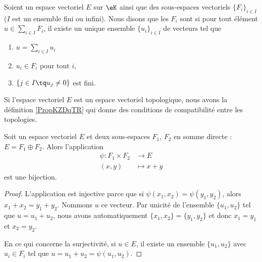 \begin{definition}       \label{DEFooIJDNooRUDUYF}
	Soient un espace vectoriel \( E\) sur \(\eK\) ainsi que des sous-espaces vectoriels \( \{ F_i \}_{i\in I}\) (\( I\) est un ensemble fini ou infini). Nous disons que les \( F_i\) sont  si pour tout élément \( u\in\sum_{i\in I}F_i\), il existe un unique ensemble \( \{ u_i \}_{i\in I}\) de vecteurs tel que
	\begin{enumerate}
		\item
		      \( u=\sum_{i\in I}u_i\)
		\item
		      \( u_i\in F_i\) pour tout \( i\),
		\item
		      \( \{ j\in I\tq u_j\neq 0 \}\) est fini.
	\end{enumerate}

	Si l'espace vectoriel \( E\) est un espace vectoriel topologique, nous avons la définition \ref{PropKZDqTR} qui donne des conditions de compatibilité entre les topologies.
\end{definition}


\begin{lemma}   \label{LEMooHWRVooLedAmF}
	Soit un espace vectoriel \( E\) et deux sous-espaces \( F_1\), \( F_2\) en somme directe :  \( E=F_1\oplus F_2\). Alors l'application
	\begin{equation}
		\begin{aligned}
			\psi\colon F_1\times F_2 & \to E       \\
			(x,y)                    & \mapsto x+y
		\end{aligned}
	\end{equation}
	est une bijection.
\end{lemma}

\begin{proof}
	L'application est injective parce que si \( \psi(x_1,x_2)=\psi(y_1,y_2)\), alors \( x_1+x_2=y_1+y_2\). Nommons \(u\) ce vecteur. Par unicité de l'ensemble \(  \{ u_1,u_2 \} \) tel que \( u=u_1+u_2\), nous avons automatiquement \( \{ x_1,x_2 \}=\{ y_1,y_2 \}\) et donc \( x_1=y_1\) et \( x_2=y_2\).

	En ce qui concerne la surjectivité, si \( u\in E\), il existe un ensemble \( \{ u_1,u_2 \}\) avec \( u_i\in F_i\) tel que \( u=u_1+u_2=\psi(u_1,u_2)\).
\end{proof}


